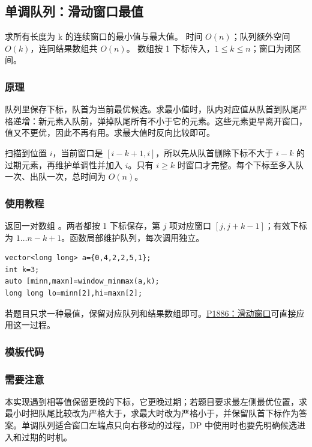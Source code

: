 \subsection{单调队列：滑动窗口最值}
\label{ds:monotonic-queue}
\AlgorithmInfo
    {求所有长度为 k 的连续窗口的最小值与最大值。}
    {时间 $O(n)$；队列额外空间 $O(k)$，连同结果数组共 $O(n)$。}
    {数组按 1 下标传入，$1\le k\le n$；窗口为闭区间。}
\subsubsection*{原理}
队列里保存下标，队首为当前最优候选。求最小值时，队内对应值从队首到队尾严格递增：新元素入队前，弹掉队尾所有不小于它的元素。这些元素更早离开窗口，值又不更优，因此不再有用。求最大值时反向比较即可。

扫描到位置 $i$，当前窗口是 $[i-k+1,i]$，所以先从队首删除下标不大于 $i-k$ 的过期元素，再维护单调性并加入 $i$。只有 $i\ge k$ 时窗口才完整。每个下标至多入队一次、出队一次，总时间为 $O(n)$。
\subsubsection*{使用教程}
 返回一对数组 。两者都按 1 下标保存，第 $j$ 项对应窗口 $[j,j+k-1]$；有效下标为 $1\ldots n-k+1$。函数局部维护队列，每次调用独立。
\begin{lstlisting}[style=mtycpp,numbers=none]
vector<long long> a={0,4,2,2,5,1};
int k=3;
auto [minn,maxn]=window_minmax(a,k);
long long lo=minn[2],hi=maxn[2];
\end{lstlisting}
若题目只求一种最值，保留对应队列和结果数组即可。\href{https://www.luogu.com.cn/problem/P1886}{P1886：滑动窗口}可直接应用这一过程。
\subsubsection*{模板代码}
\subsubsection*{需要注意}
本实现遇到相等值保留更晚的下标，它更晚过期；若题目要求最左侧最优位置，求最小时把队尾比较改为严格大于，求最大时改为严格小于，并保留队首下标作为答案。单调队列适合窗口左端点只向右移动的过程，DP 中使用时也要先明确候选进入和过期的时机。

